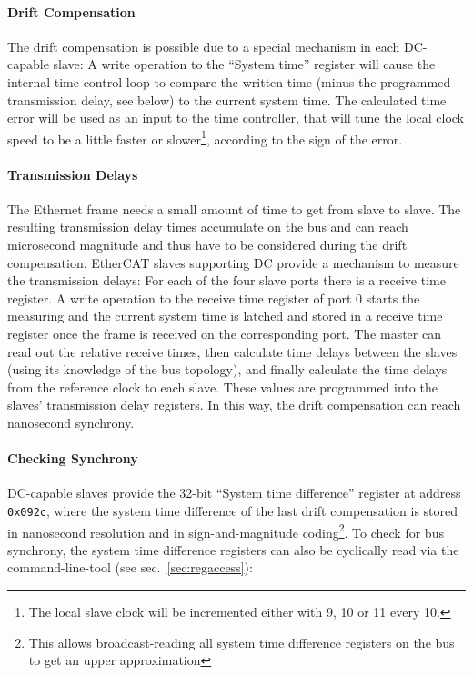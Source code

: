 \documentclass[a4paper,12pt,BCOR6mm,bibtotoc,idxtotoc]{scrbook}
\begin{document}
\paragraph{Drift Compensation} The drift compensation is possible due to a
special mechanism in each DC-capable slave: A write operation to the ``System
time'' register will cause the internal time control loop to compare the
written time (minus the programmed transmission delay, see below) to the
current system time. The calculated time error will be used as an input to the
time controller, that will tune the local clock speed to be a little faster or
slower\footnote{The local slave clock will be incremented either with
\unit{9}{\nano\second}, \unit{10}{\nano\second} or \unit{11}{\nano\second}
every \unit{10}{\nano\second}.}, according to the sign of the error.

\paragraph{Transmission Delays} The Ethernet frame needs a small amount of
time to get from slave to slave. The resulting transmission delay times
accumulate on the bus and can reach microsecond magnitude and thus have to be
considered during the drift compensation. EtherCAT slaves supporting DC
provide a mechanism to measure the transmission delays: For each of the four
slave ports there is a receive time register. A write operation to the receive
time register of port 0 starts the measuring and the current system time is
latched and stored in a receive time register once the frame is received on
the corresponding port. The master can read out the relative receive times,
then calculate time delays between the slaves (using its knowledge of the bus
topology), and finally calculate the time delays from the reference clock to
each slave. These values are programmed into the slaves' transmission delay
registers. In this way, the drift compensation can reach nanosecond synchrony. 

\paragraph{Checking Synchrony} DC-capable slaves provide the 32-bit ``System
time difference'' register at address \lstinline+0x092c+, where the system
time difference of the last drift compensation is stored in nanosecond
resolution and in sign-and-magnitude coding\footnote{This allows
broadcast-reading all system time difference registers on the bus to get an
upper approximation}. To check for bus synchrony, the system time difference
registers can also be cyclically read via the command-line-tool (see
sec.~\ref{sec:regaccess}):
\end{document}
